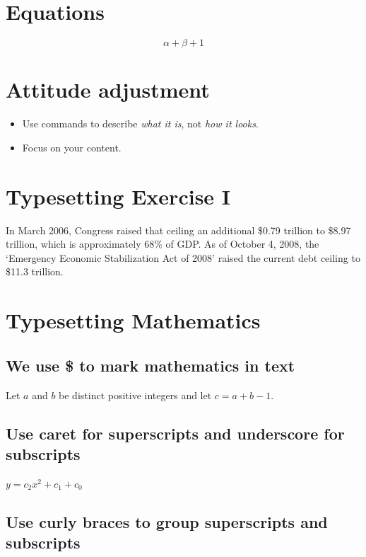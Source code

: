\documentclass[12pt]{article}
\begin{document}
\section{Equations}

\begin{equation}
    \alpha + \beta + 1
\end{equation}

\section{Attitude adjustment}

\begin{itemize}
    \item Use commands to describe \emph{what it is}, not \emph{how it looks}.
    \item Focus on your content.
\end{itemize}

\section{Typesetting Exercise I}

In March 2006, Congress raised that ceiling an additional \$0.79 trillion to \$8.97 trillion, which is approximately 68\% of GDP. As of October 4, 2008, the `Emergency Economic Stabilization Act of 2008' raised the current debt ceiling to \$11.3 trillion.

\section{Typesetting Mathematics}

\subsection{We use \$ to mark mathematics in text}

Let $a$ and $b$ be distinct positive integers and let $c = a + b - 1$.

\subsection{Use caret for superscripts and underscore for subscripts} 

$y = c_2 x^2 + c_1 + c_0$

\subsection{Use curly braces to group superscripts and subscripts}
\end{document}

